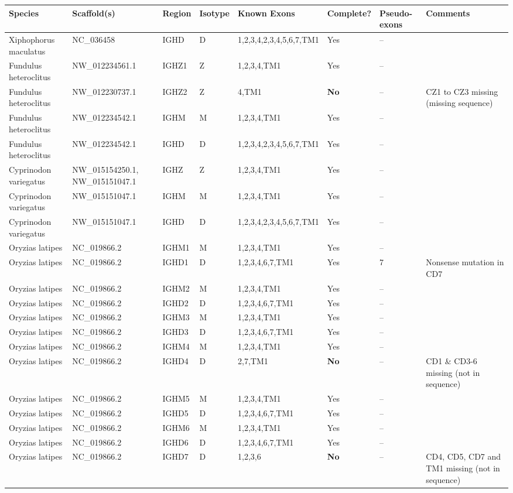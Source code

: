 \begin{tabular}{llllllll}
  \toprule \textbf{\textnormal{Species}} & \textbf{Scaffold(s)} & \textbf{Region} & \textbf{Isotype} & \textbf{Known Exons} \tnote{1} & \textbf{Complete?} & \textbf{Pseudo-exons} & \textbf{Comments} \\ 
  \midrule Xiphophorus maculatus & NC\_036458 & IGHD & D & 1,2,3,4,2,3,4,5,6,7,TM1 & Yes & -- &  \\ 
  Fundulus heteroclitus & NW\_012234561.1 & IGHZ1 & Z & 1,2,3,4,TM1 & Yes & -- &  \\ 
  Fundulus heteroclitus & NW\_012230737.1 & IGHZ2 & Z & 4,TM1 & \textbf{No} & -- & CZ1 to CZ3 missing (missing sequence) \\ 
  Fundulus heteroclitus & NW\_012234542.1 & IGHM & M & 1,2,3,4,TM1 & Yes & -- &  \\ 
  Fundulus heteroclitus & NW\_012234542.1 & IGHD & D & 1,2,3,4,2,3,4,5,6,7,TM1 & Yes & -- &  \\ 
  Cyprinodon variegatus & NW\_015154250.1, NW\_015151047.1 & IGHZ & Z & 1,2,3,4,TM1 & Yes & -- &  \\ 
  Cyprinodon variegatus & NW\_015151047.1 & IGHM & M & 1,2,3,4,TM1 & Yes & -- &  \\ 
  Cyprinodon variegatus & NW\_015151047.1 & IGHD & D & 1,2,3,4,2,3,4,5,6,7,TM1 & Yes & -- &  \\ 
  Oryzias latipes & NC\_019866.2 & IGHM1 & M & 1,2,3,4,TM1 & Yes & -- &  \\ 
  Oryzias latipes & NC\_019866.2 & IGHD1 & D & 1,2,3,4,6,7,TM1 & Yes & 7 & Nonsense mutation in CD7 \\ 
  Oryzias latipes & NC\_019866.2 & IGHM2 & M & 1,2,3,4,TM1 & Yes & -- &  \\ 
  Oryzias latipes & NC\_019866.2 & IGHD2 & D & 1,2,3,4,6,7,TM1 & Yes & -- &  \\ 
  Oryzias latipes & NC\_019866.2 & IGHM3 & M & 1,2,3,4,TM1 & Yes & -- &  \\ 
  Oryzias latipes & NC\_019866.2 & IGHD3 & D & 1,2,3,4,6,7,TM1 & Yes & -- &  \\ 
  Oryzias latipes & NC\_019866.2 & IGHM4 & M & 1,2,3,4,TM1 & Yes & -- &  \\ 
  Oryzias latipes & NC\_019866.2 & IGHD4 & D & 2,7,TM1 & \textbf{No} & -- & CD1 \& CD3-6 missing (not in sequence) \\ 
  Oryzias latipes & NC\_019866.2 & IGHM5 & M & 1,2,3,4,TM1 & Yes & -- &  \\ 
  Oryzias latipes & NC\_019866.2 & IGHD5 & D & 1,2,3,4,6,7,TM1 & Yes & -- &  \\ 
  Oryzias latipes & NC\_019866.2 & IGHM6 & M & 1,2,3,4,TM1 & Yes & -- &  \\ 
  Oryzias latipes & NC\_019866.2 & IGHD6 & D & 1,2,3,4,6,7,TM1 & Yes & -- &  \\ 
  Oryzias latipes & NC\_019866.2 & IGHD7 & D & 1,2,3,6 & \textbf{No} & -- & CD4, CD5, CD7 and TM1 missing (not in sequence) \\ 
   \bottomrule \end{tabular}

